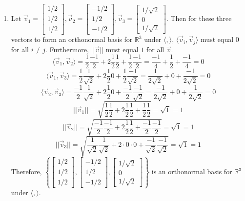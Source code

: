 \documentclass[10pt,english]{article}
\begin{document}
\begin{enumerate}
\pagebreak
\item Let $\vec{v}_1=\begin{bmatrix}1/2\\1/2\\1/2\end{bmatrix},\vec{v}_2=\begin{bmatrix}-1/2\\1/2\\-1/2\end{bmatrix},\vec{v}_3=\begin{bmatrix}1/\sqrt{2}\\0\\1/\sqrt{2}\end{bmatrix}$. Then for these three vectors to form an orthonormal basis for $\mathbb{R}^3$ under $\langle,\rangle$, $\langle\vec{v}_i,\vec{v}_j\rangle$ must equal $0$ for all $i\neq j$. Furthermore, $||\vec{v}||$ must equal $1$ for all $\vec{v}$. \\ 
$$\langle\vec{v}_1,\vec{v}_2\rangle=\frac{1}{2}\frac{-1}{2}+2\frac{1}{2}\frac{1}{2}+\frac{1}{2}\frac{-1}{2}=\frac{-1}{4}+\frac{1}{2}+\frac{-1}{4}=0$$
$$\langle\vec{v}_1,\vec{v}_3\rangle=\frac{1}{2}\frac{1}{\sqrt{2}}+2\frac{1}{2}0+\frac{1}{2}\frac{-1}{\sqrt{2}}=\frac{1}{2\sqrt{2}}+0+\frac{-1}{2\sqrt{2}}=0$$
$$\langle\vec{v}_2,\vec{v}_3\rangle=\frac{-1}{2}\frac{1}{\sqrt{2}}+2\frac{1}{2}0+\frac{-1}{2}\frac{-1}{\sqrt{2}}=\frac{-1}{2\sqrt{2}}+0+\frac{1}{2\sqrt{2}}=0$$
$$||\vec{v}_1||=\sqrt{\frac{1}{2}\frac{1}{2}+2\frac{1}{2}\frac{1}{2}+\frac{1}{2}\frac{1}{2}}=\sqrt{1}=1$$
$$||\vec{v}_2||=\sqrt{\frac{-1}{2}\frac{-1}{2}+2\frac{1}{2}\frac{1}{2}+\frac{-1}{2}\frac{-1}{2}}=\sqrt{1}=1$$
$$||\vec{v}_3||=\sqrt{\frac{1}{\sqrt{2}}\frac{1}{\sqrt{2}}+2\cdot0\cdot0+\frac{-1}{\sqrt{2}}\frac{-1}{\sqrt{2}}}=\sqrt{1}=1$$
Therefore, $\left\{\begin{bmatrix}1/2\\1/2\\1/2\end{bmatrix},\begin{bmatrix}-1/2\\1/2\\-1/2\end{bmatrix},\begin{bmatrix}1/\sqrt{2}\\0\\1/\sqrt{2}\end{bmatrix}\right\}$ is an orthonormal basis for $\mathbb{R}^3$ under $\langle,\rangle$. 


\end{enumerate}
\end{document}
